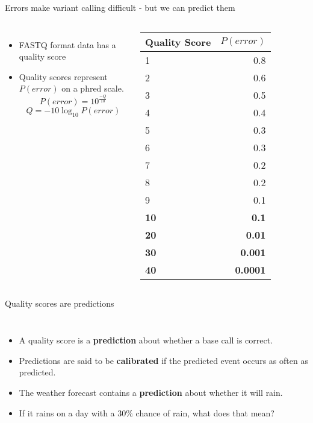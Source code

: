 \documentclass{beamer}
\begin{document}
\begin{frame}{Errors make variant calling difficult - but we can predict them}

\begin{columns}
	\begin{itemize}
		\item FASTQ format data has a quality score
		\item Quality scores represent $P(error)$ on a phred scale.
		\begin{displaymath}
		P(error) = 10^{\frac{-Q}{10}}
		\end{displaymath}
		\begin{displaymath}
		Q = -10\log_{10}{P(error)}
		\end{displaymath}
	\end{itemize}
	\begin{tabular}{l r} \toprule
	\bfseries Quality Score & \bfseries $P(error)$ \\
	\hline
	1 & 0.8 \\
	2 & 0.6 \\
	3 & 0.5 \\
	4 & 0.4 \\
	5 & 0.3 \\
	6 & 0.3 \\
	7 & 0.2 \\
	8 & 0.2 \\
	9 & 0.1 \\
	\bfseries 10 & \bfseries  0.1 \\
	\bfseries 20 & \bfseries 0.01 \\
	\bfseries 30 & \bfseries 0.001 \\
	\bfseries 40 & \bfseries 0.0001 \\
	\end{tabular}
\end{columns}

\end{frame}

\begin{frame}{Quality scores are predictions}
\begin{columns}
\begin{itemize}
\item A quality score is a \textbf{prediction} about whether a base call is correct.
\item Predictions are said to be \textbf{calibrated} if the predicted event occurs as often as predicted.
\item The weather forecast contains a \textbf{prediction} about whether it will rain.
\item If it rains on a day with a 30\% chance of rain, what does that mean?
\end{itemize}
\end{columns}
\end{frame}
\end{document}
